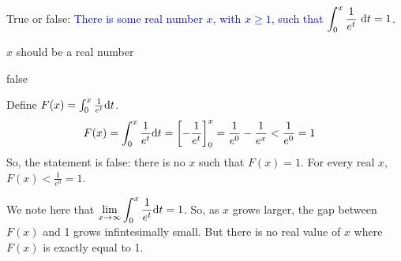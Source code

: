 


\begin{question}
True or false:
\textcolor{blue}{There is some real number $x$, with $x \geq 1$, such that $\displaystyle\int_0^x \frac{1}{e^t}~\mathrm{d}t = 1$. }
\end{question}
\begin{hint}
$x$ should be a real number
\end{hint}
\begin{answer}
false
\end{answer}
\begin{solution}
Define $F(x)=
\int_0^x \frac{1}{e^{t}}\mathrm{d}t$.
\begin{align*}
F(x)=\int_0^x \frac{1}{e^{t}}\mathrm{d}t&=\left[-\frac{1}{e^{t}}\right]_0^x
 = \frac{1}{e^0}-\frac{1}{e^{x}}<\frac{1}{e^0}=1
\end{align*}
So, the statement is false: there is no $x$ such that $F(x)=1$. For every real $x$, $F(x) < \frac{1}{e^0}=1$.

We note here that $\displaystyle\lim_{x \to \infty} \int_0^x\frac{1}{e^{t}}\mathrm{d}t=1$. So, as $x$ grows larger, the gap between $F(x)$ and 1 grows infintesimally small. But there is no real value of $x$ where $F(x)$ is exactly equal to 1.

\end{solution}

